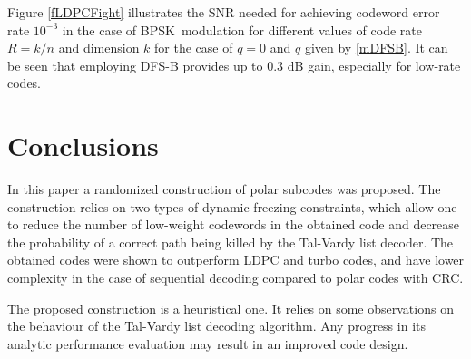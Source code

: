\documentclass[conference]{IEEEtran}
\theoremstyle{plain}
\begin{document}
Figure \ref{fLDPCFight} illustrates the SNR needed for achieving codeword error rate $10^{-3}$  in the case of BPSK\ modulation for different values of code rate $R=k/n$ and dimension  $k$ for the case of $q=0$ and $q$ given by  \eqref{mDFSB}. It can be seen that employing DFS-B provides up to 0.3 dB gain, especially for low-rate codes.

\section{Conclusions}
In this paper a  randomized construction of polar subcodes was proposed. The construction relies on two types of dynamic freezing constraints, which allow one to reduce the number of low-weight codewords in the obtained code and decrease the probability of a correct path being killed by the Tal-Vardy list decoder. The obtained codes were shown to outperform LDPC and turbo codes, and have  lower complexity in the case of sequential decoding compared to polar codes with CRC. 

The proposed construction is a heuristical one. It relies on some observations on the behaviour of the Tal-Vardy list decoding algorithm. Any progress in its analytic performance evaluation may result in an improved code design.
\end{document}
